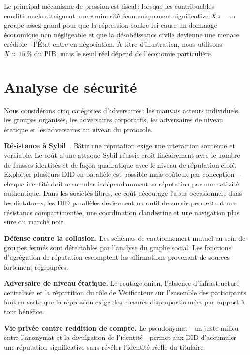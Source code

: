 \documentclass[11pt,a4paper,twocolumn]{article}
\begin{document}
Le principal mécanisme de pression est fiscal\,: lorsque les contribuables conditionnels atteignent une «\,minorité économiquement significative $X$\,»---un groupe assez grand pour que la répression contre lui cause un dommage économique non négligeable et que la désobéissance civile devienne une menace crédible---l'État entre en négociation. À titre d'illustration, nous utilisons $X \approx 15\,\%$ du PIB, mais le seuil réel dépend de l'économie particulière.

\section{Analyse de sécurité}

Nous considérons cinq catégories d'adversaires\,: les mauvais acteurs individuels, les groupes organisés, les adversaires corporatifs, les adversaires de niveau étatique et les adversaires au niveau du protocole.

\textbf{Résistance à Sybil}~\cite{douceur2002}. Bâtir une réputation exige une interaction soutenue et vérifiable. Le coût d'une attaque Sybil réussie croît linéairement avec le nombre de fausses identités et de façon quadratique avec le niveau de réputation ciblé. Exploiter plusieurs DID en parallèle est possible mais coûteux par conception---chaque identité doit accumuler indépendamment sa réputation par une activité authentique. Dans les sociétés libres, ce coût décourage l'abus occasionnel\,; dans les dictatures, les DID parallèles deviennent un outil de survie permettant une résistance compartimentée, une coordination clandestine et une navigation plus sûre du marché noir.

\textbf{Défense contre la collusion.} Les schémas de cautionnement mutuel au sein de groupes fermés sont détectables par l'analyse du graphe social. Les fonctions d'agrégation de réputation escomptent les affirmations provenant de sources fortement regroupées.

\textbf{Adversaire de niveau étatique.} Le routage onion, l'absence d'infrastructure centralisée et la répartition du rôle de Vérificateur sur l'ensemble des participants font en sorte que la répression exige des mesures disproportionnées par rapport à tout bénéfice.

\textbf{Vie privée contre reddition de compte.} Le pseudonymat---un juste milieu entre l'anonymat et la divulgation de l'identité---permet aux DID d'accumuler une réputation significative sans révéler l'identité réelle du titulaire.
\end{document}
